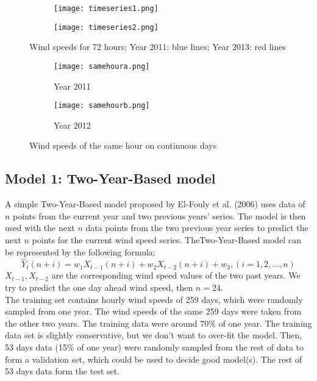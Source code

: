 \documentclass{article}
\begin{document}
\begin{figure}[h]
  \begin{subfigure}[b]{0.5\textwidth}
    \texttt{[image: timeseries1.png]}
    \caption{}
    \label{fig:f1}
  \end{subfigure}
  \hfill
  \begin{subfigure}[b]{0.5\textwidth}
    \texttt{[image: timeseries2.png]}
    \caption{}
    \label{fig:f2}
  \end{subfigure}
  \caption{Wind speeds for 72 hours; Year 2011: blue lines; Year 2013: red lines}
\end{figure}

\begin{figure}[h]
  \begin{subfigure}[b]{0.5\textwidth}
    \texttt{[image: samehoura.png]}
    \caption{Year 2011}
    \label{fig:f1}
  \end{subfigure}
  \hfill
  \begin{subfigure}[b]{0.5\textwidth}
    \texttt{[image: samehourb.png]}
    \caption{Year 2012}
    \label{fig:f2}
  \end{subfigure}
  \caption{Wind speeds of the same hour on continuous days}
\end{figure}

\subsection*{Model 1: Two-Year-Based model}
A simple Two-Year-Based model proposed by El-Fouly et al. (2006) uses data of  $n$ points from the
current year and two previous years’ series.  The model is then used with the next $n$ data points from the two previous year series to predict the next  $n$ points for the current wind speed series. TheTwo-Year-Based model can be represented by the following formula: \\
\begin{equation*}
\hat{Y}_t (n+i) = w_1X_{t-1}(n+i) + w_2 X_{t-2}(n+i) +w_3, (i = 1, 2, ... , n)
\end{equation*}
$X_{t-1}, X_{t-2}$ are the corresponding wind speed values of the two past years. We try to predict the one day ahead wind speed, then $n=24$. \\
The training set contains hourly wind speeds of 259 days, which were randomly sampled from one year.  The wind speeds of the same 259 days were taken from the other two years. The training data were around 70\%   of one year.  The training data set is slightly conservative, but we don't want to over-fit the model.  Then, 53 days data (15\% of one year) were randomly sampled from the rest of data to form a validation set, which could be used to decide good model(s).  The rest of 53 days data form the test set.\\
\end{document}
